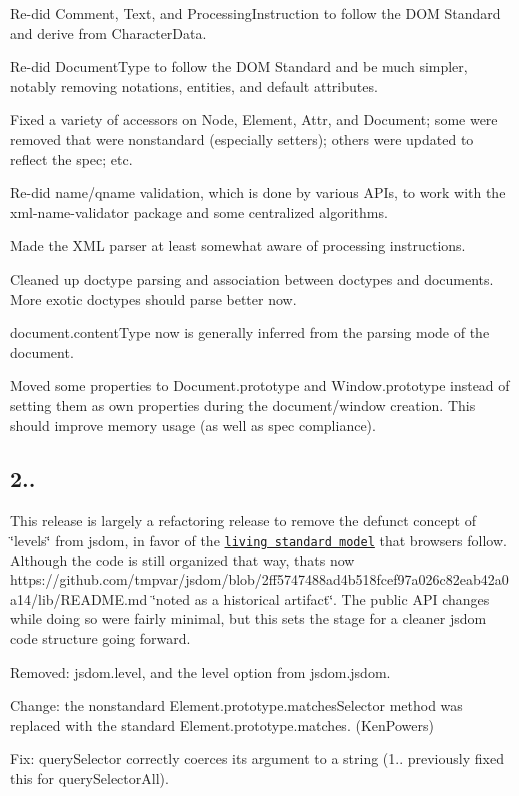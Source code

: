 \begin{DoxyItemize}
\item Re-\/did {\ttfamily Comment}, {\ttfamily Text}, and {\ttfamily Processing\+Instruction} to follow the D\+OM Standard and derive from {\ttfamily Character\+Data}.
\item Re-\/did {\ttfamily Document\+Type} to follow the D\+OM Standard and be much simpler, notably removing notations, entities, and default attributes.
\item Fixed a variety of accessors on {\ttfamily Node}, {\ttfamily Element}, {\ttfamily Attr}, and {\ttfamily Document}; some were removed that were nonstandard (especially setters); others were updated to reflect the spec; etc.
\item Re-\/did name/qname validation, which is done by various A\+P\+Is, to work with the xml-\/name-\/validator package and some centralized algorithms.
\item Made the X\+ML parser at least somewhat aware of processing instructions.
\item Cleaned up doctype parsing and association between doctypes and documents. More exotic doctypes should parse better now.
\item {\ttfamily document.\+content\+Type} now is generally inferred from the parsing mode of the document.
\item Moved some properties to {\ttfamily Document.\+prototype} and {\ttfamily Window.\+prototype} instead of setting them as own properties during the document/window creation. This should improve memory usage (as well as spec compliance).
\end{DoxyItemize}

\subsection*{2..}

This release is largely a refactoring release to remove the defunct concept of \char`\"{}levels\char`\"{} from jsdom, in favor of the \href{https://wiki.whatwg.org/wiki/FAQ#What_does_.22Living_Standard.22_mean.3F}{\tt living standard model} that browsers follow. Although the code is still organized that way, that\textquotesingle{}s now https\+://github.com/tmpvar/jsdom/blob/2ff5747488ad4b518fcef97a026c82eab42a0a14/lib/\+R\+E\+A\+D\+M\+E.\+md \char`\"{}noted as a historical artifact\char`\"{}. The public A\+PI changes while doing so were fairly minimal, but this sets the stage for a cleaner jsdom code structure going forward.


\begin{DoxyItemize}
\item Removed\+: {\ttfamily jsdom.\+level}, and the {\ttfamily level} option from {\ttfamily jsdom.\+jsdom}.
\item Change\+: the nonstandard {\ttfamily Element.\+prototype.\+matches\+Selector} method was replaced with the standard {\ttfamily Element.\+prototype.\+matches}. (Ken\+Powers)
\item Fix\+: {\ttfamily query\+Selector} correctly coerces its argument to a string (1.. previously fixed this for {\ttfamily query\+Selector\+All}).
\end{DoxyItemize}

